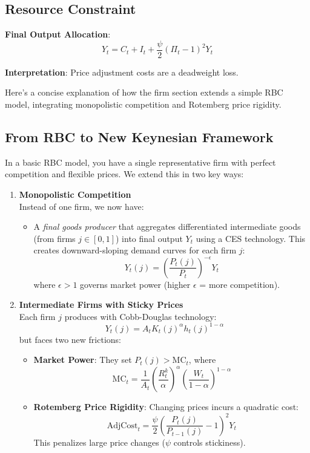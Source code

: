 \documentclass[11pt,preprint]{elsarticle}
\numberwithin{equation}{section}
\numberwithin{figure}{section}
\numberwithin{table}{section}
\def\tightlist{} %
\begin{document}
\subsection{Resource Constraint}\label{resource-constraint}

\textbf{Final Output Allocation}: \[
Y_t = C_t + I_t + \frac{\psi}{2} (\Pi_t - 1)^2 Y_t
\]

\textbf{Interpretation}: Price adjustment costs are a deadweight loss.

Here's a concise explanation of how the firm section extends a simple
RBC model, integrating monopolistic competition and Rotemberg price
rigidity.

\subsection{From RBC to New Keynesian
Framework}\label{from-rbc-to-new-keynesian-framework}

In a basic RBC model, you have a single representative firm with perfect
competition and flexible prices. We extend this in two key ways:

\begin{enumerate}
\def\labelenumi{\arabic{enumi}.}
\item
  \textbf{Monopolistic Competition}\\
  Instead of one firm, we now have:

  \begin{itemize}
  \tightlist
  \item
    A \emph{final goods producer} that aggregates differentiated
    intermediate goods (from firms \(j \in [0,1]\)) into final output
    \(Y_t\) using a CES technology. This creates downward-sloping demand
    curves for each firm \(j\): \[
    Y_t(j) = \left(\frac{P_t(j)}{P_t}\right)^{-\epsilon} Y_t
    \] where \(\epsilon > 1\) governs market power (higher \(\epsilon\)
    = more competition).
  \end{itemize}
\item
  \textbf{Intermediate Firms with Sticky Prices}\\
  Each firm \(j\) produces with Cobb-Douglas technology: \[
  Y_t(j) = A_t K_t(j)^\alpha h_t(j)^{1-\alpha}
  \] but faces two new frictions:

  \begin{itemize}
  \tightlist
  \item
    \textbf{Market Power}: They set \(P_t(j) > \text{MC}_t\), where \[
    \text{MC}_t = \frac{1}{A_t} \left(\frac{R_t^k}{\alpha}\right)^\alpha \left(\frac{W_t}{1-\alpha}\right)^{1-\alpha}
    \]
  \item
    \textbf{Rotemberg Price Rigidity}: Changing prices incurs a
    quadratic cost: \[
    \text{AdjCost}_t = \frac{\psi}{2} \left(\frac{P_t(j)}{P_{t-1}(j)} - 1\right)^2 Y_t
    \] This penalizes large price changes (\(\psi\) controls
    stickiness).
  \end{itemize}
\end{enumerate}
\end{document}
